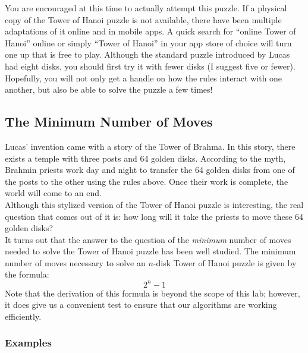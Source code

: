 		You are encouraged at this time to actually attempt this puzzle. If a physical copy of the Tower of Hanoi puzzle is not available, there have been multiple adaptations of it online and in mobile apps. A quick search for ``online Tower of Hanoi'' online or simply ``Tower of Hanoi'' in your app store of choice will turn one up that is free to play. Although the standard puzzle introduced by Lucas had eight disks, you should first try it with fewer disks (I suggest five or fewer). Hopefully, you will not only get a handle on how the rules interact with one another, but also be able to solve the puzzle a few times!

		\subsection{The Minimum Number of Moves}
			Lucas' invention came with a story of the Tower of Brahma. In this story, there exists a temple with three posts and 64 golden disks. According to the myth, Brahmin priests work day and night to transfer the 64 golden disks from one of the posts to the other using the rules above. Once their work is complete, the world will come to an end.\\[\baselineskip]
			Although this stylized version of the Tower of Hanoi puzzle is interesting, the real question that comes out of it is: how long will it take the priests to move these 64 golden disks?\\[\baselineskip]
			It turns out that the answer to the question of the \emph{minimum} number of moves needed to solve the Tower of Hanoi puzzle has been well studied. The minimum number of moves necessary to solve an $n$-disk Tower of Hanoi puzzle is given by the formula:
			\[ 2^{n} - 1 \]
			Note that the derivation of this formula is beyond the scope of this lab; however, it does give us a convenient test to ensure that our algorithms are working efficiently.

			\subsubsection*{Examples}
			\ \\[9pt]

